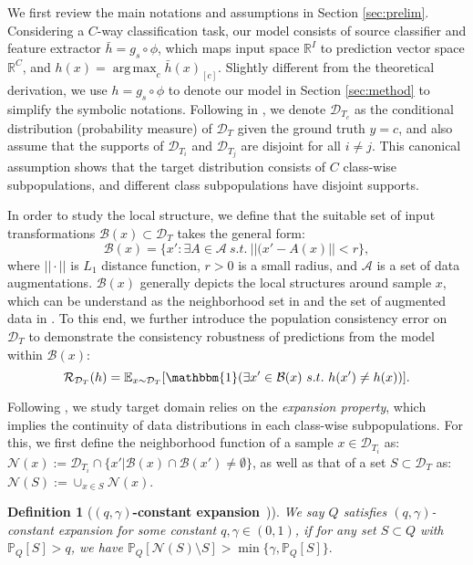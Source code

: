\documentclass{article}
\newtheorem{definition}{Definition}[section]
\DeclareMathOperator*{\argmax}{arg\,max}
\begin{document}
We first review the main notations and assumptions in Section \ref{sec:prelim}. Considering a $C$-way classification task, our model consists of source classifier and feature extractor $\bar{h} = g_s \circ \phi$, which maps input space $\mathbb{R}^I$ to prediction vector space $\mathbb{R}^C$, and $h(x) = \argmax_c \bar{h}(x)_{[c]}$. Slightly different from the theoretical derivation, we use $h=g_s \circ \phi$ to denote our model in Section \ref{sec:method} to simplify the symbolic notations.
Following in \cite{NIPS_2021_cycle,ICLR_2021_theory_wei,ICML_2021_theory_lp,ben2010theory}, we denote $\mathcal{D}_{T_c}$ as the conditional distribution (probability measure) of $\mathcal{D}_T$ given the ground truth $y=c$, and also assume that the supports of $\mathcal{D}_{T_i}$ and $\mathcal{D}_{T_j}$ are disjoint for all $i\neq j$. This canonical assumption shows that the target distribution consists of $C$ class-wise subpopulations, and different class subpopulations have disjoint supports. 

In order to study the local structure, we define that the suitable set of input transformations $\mathcal{B}(x)\subset \mathcal{D}_T$ takes the general form:
$$\mathcal{B}(x) = \{x': \exists A\in \mathcal{A} \ s.t. \ ||(x'-A(x)||<r \},$$
where $||\cdot||$ is $L_1$ distance function, $r>0$ is a small radius, and $\mathcal{A}$ is a set of data augmentations. $\mathcal{B}(x)$ generally depicts the local structures around sample $x$, which can be understand as the neighborhood set in \cite{nrc_nips_2021,gsfda_iccv_2021} and the set of augmented data in \cite{liang2021shot_pp,NeurIPS2020_aumentation}. To this end, we further introduce the population consistency error on $\mathcal{D}_T$ to demonstrate the consistency robustness of predictions from the model within $\mathcal{B}(x)$: 
$$\mathcal{R}_{\mathcal{D}_T}(h) = \mathbb{E}_{x\sim \mathcal{D}_T}[\mathbbm{1}(\exists x' \in \mathcal{B}(x) \ s.t. \ h(x')\neq h(x))].$$

Following \cite{NIPS_2021_cycle,ICML_2021_theory_lp,ICLR_2021_theory_wei}, we study target domain relies on the \textit{expansion property}, which implies the continuity of data distributions in each class-wise subpopulations. For this, we first define the neighborhood function of a sample $x \in \mathcal{D}_{T_i}$ as:
$\mathcal{N}(x):= \mathcal{D}_{T_i} \cap \{x'|\mathcal{B}(x)\cap \mathcal{B}(x') \neq \emptyset \}$, as well as that of a set $S\subset \mathcal{D}_T$ as: $\mathcal{N}(S) := \cup_{x\in S} \mathcal{N}(x)$. 

\begin{definition}[\textbf{$(q,\gamma)$-constant expansion}~\cite{ICLR_2021_theory_wei})]\label{expansion1}
 We say $Q$ satisfies $(q,\gamma)$-constant expansion for some constant $q,\gamma \in (0,1)$, if for any set $S \subset Q$ with $ \mathbb{P}_{Q}[S] >q$, we have $\mathbb{P}_{Q}[\mathcal{N}(S) \setminus S]>\min{\{\gamma,\mathbb{P}_{Q}[S]\}}.$
\end{definition}
\end{document}
